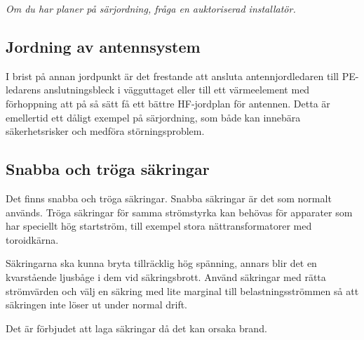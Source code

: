 \emph{Om du har planer på särjordning, fråga en auktoriserad installatör.}

\subsection{Jordning av antennsystem}

I brist på annan jordpunkt är det frestande att ansluta antennjordledaren till
PE-ledarens anslutningsbleck i vägguttaget eller till ett värmeelement med
förhoppning att på så sätt få ett bättre HF-jordplan för antennen.
Detta är emellertid ett dåligt exempel på särjordning, som både kan innebära
säkerhetsrisker och medföra störningsproblem.

\subsection{Snabba och tröga säkringar}

Det finns snabba och tröga säkringar.
Snabba säkringar är det som normalt används.
Tröga säkringar för samma strömstyrka kan behövas för apparater som har
speciellt hög startström, till exempel stora nättransformatorer med toroidkärna.

Säkringarna ska kunna bryta tillräcklig hög spänning, annars blir det
en kvarstående ljusbåge i dem vid säkringsbrott.
Använd säkringar med rätta strömvärden och välj en säkring med lite marginal
till belastningsströmmen så att säkringen inte löser ut under normal drift.

Det är förbjudet att laga säkringar då det kan orsaka brand.
